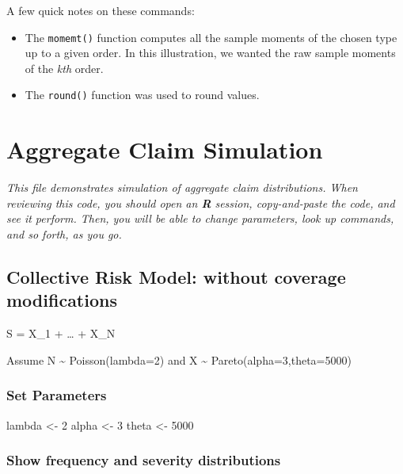 \documentclass[]{book}
\newenvironment{Shaded}{\begin{snugshade}}{\end{snugshade}}
\newcommand{\DecValTok}[1]{\textcolor[rgb]{0.00,0.00,0.81}{#1}}
\newcommand{\StringTok}[1]{\textcolor[rgb]{0.31,0.60,0.02}{#1}}
\newcommand{\NormalTok}[1]{#1}
\providecommand{\tightlist}{%
  \setlength{\itemsep}{0pt}\setlength{\parskip}{0pt}}
\theoremstyle{definition}
\theoremstyle{definition}
\theoremstyle{definition}
\theoremstyle{remark}
\begin{document}
 A few quick notes on these commands:

\begin{itemize}
\tightlist
\item
  The \texttt{momemt()} function computes all the sample moments of the
  chosen type up to a given order. In this illustration, we wanted the
  raw sample moments of the \emph{kth} order.
\item
  The \texttt{round()} function was used to round values.
\end{itemize}

\chapter{Aggregate Claim Simulation}\label{aggregate-claim-simulation}

\emph{This file demonstrates simulation of aggregate claim
distributions. When reviewing this code, you should open an \textbf{R}
session, copy-and-paste the code, and see it perform. Then, you will be
able to change parameters, look up commands, and so forth, as you go.}

\section{Collective Risk Model: without coverage
modifications}\label{collective-risk-model-without-coverage-modifications}

S = X\_1 + \ldots{} + X\_N

Assume N \textasciitilde{} Poisson(lambda=2) and X \textasciitilde{}
Pareto(alpha=3,theta=5000)

\subsection{Set Parameters}\label{set-parameters}

\begin{Shaded}
\begin{Highlighting}[]
\NormalTok{lambda <-}\StringTok{ }\DecValTok{2}
\NormalTok{alpha <-}\StringTok{ }\DecValTok{3}
\NormalTok{theta <-}\StringTok{ }\DecValTok{5000}
\end{Highlighting}
\end{Shaded}

\subsection{Show frequency and severity
distributions}\label{show-frequency-and-severity-distributions}
\end{document}
